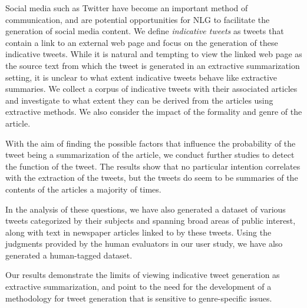 Social media such as Twitter have become an important method of communication, and are potential opportunities for NLG to facilitate the generation of social media content. We define \emph{indicative tweets} as tweets that contain a link to an external web page and focus on the generation of these indicative tweets. While it is natural and tempting to view the linked web page as the source text from which the tweet is generated in an extractive summarization setting, it is unclear to what extent indicative tweets behave like extractive summaries. We collect a corpus of indicative tweets with their associated articles and investigate to what extent they can be derived from the articles using extractive methods. We also consider the impact of the formality and genre of the article.

With the aim of finding the possible factors that influence the probability of the tweet being a summarization of the article, we conduct further studies to detect the function of the tweet. The results show that no particular intention correlates with the extraction of the tweets, but the tweets do seem to be summaries of the contents of the articles a majority of times. 

In the analysis of these questions, we have also generated a dataset of various tweets categorized by their subjects and  spanning broad areas of public interest, along with text in newspaper articles linked to by these tweets. Using the judgments provided by the human evaluators in our user study, we have also generated a human-tagged dataset.

Our results demonstrate the limits of viewing indicative tweet generation as extractive summarization, and point to the need for the development of a methodology for tweet generation that is sensitive to genre-specific issues.

